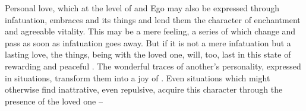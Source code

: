 \pa \act Personal love, which at the level of  and Ego
may also be expressed through infatuation, embraces 
and its things and lend them the character of enchantment and
agreeable vitality.  This may be a mere feeling, a series of
 which change and pass as soon as infatuation goes
away.  But if it is not a mere infatuation but a lasting love, the
things, being  with the loved one, will, too, last in this
state of rewarding and peaceful .  The wonderful traces
of another's personality, expressed in  situations, 
transform them into a joy of . Even situations which 
 might otherwise find inattrative, even repulsive, acquire this 
character through the presence of the loved one -- 

